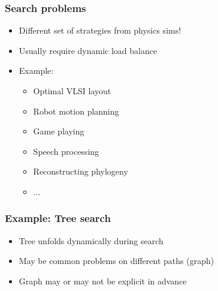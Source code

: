 \documentclass{beamer}
\begin{document}
\begin{frame}
  \frametitle{Search problems}

  \begin{itemize}
  \item Different set of strategies from physics sims!
  \item Usually require dynamic load balance
  \item Example:
    \begin{itemize}
    \item Optimal VLSI layout
    \item Robot motion planning
    \item Game playing
    \item Speech processing
    \item Reconstructing phylogeny
    \item ...
    \end{itemize}
  \end{itemize}
\end{frame}


\begin{frame}
  \frametitle{Example: Tree search}

  \begin{center}
  \end{center}
  \begin{itemize}
  \item Tree unfolds dynamically during search
  \item May be common problems on different paths (graph)
  \item Graph may or may not be explicit in advance
  \end{itemize}
\end{frame}
\end{document}
